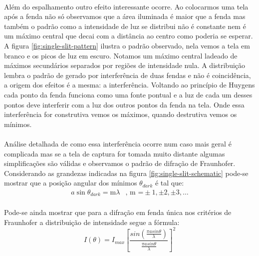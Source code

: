 \documentclass[a4paper,11pt]{article}
\begin{document}
\paragraph{}Além do espalhamento outro efeito interessante ocorre. 
Ao colocarmos uma tela após a fenda não só observamos que a área
iluminada é maior que a fenda mas também o padrão como a intensidade
de luz se distribui não é constante nem é um máximo central que decai 
com a distância ao centro como poderia se esperar.
 A figura \ref{fig:single-slit-pattern}
ilustra o padrão observado, nela vemos a tela em branco e os picos
de luz em escuro. Notamos um máximo central ladeado de máximos
secundários separados por regiões de intensidade nula. A distribuição 
lembra o padrão de gerado por interferência de duas fendas e não
é coincidência, a origem dos efeitos é a mesma: a interferência.
Voltando ao princípio de Huygens cada ponto da fenda funciona como
uma fonte pontual e a luz de cada um desses pontos deve interferir
com a luz dos outros pontos da fenda na tela. Onde essa interferência for
construtiva vemos os máximos, quando destrutiva vemos os 
mínimos.

\paragraph{} Análise detalhada de como essa interferência ocorre
num caso mais geral é complicada mas se a tela de captura for tomada
muito distante algumas simplificações são válidas e observamos o padrão
de difração de Fraunhofer. Considerando as grandezas indicadas na figura
\ref{fig:single-slit-schematic} pode-se mostrar que a posição
 angular dos mínimos $\theta _{dark}$ 
é tal que:
\begin{equation}
	\begin{array}{ll}
	a \sin \theta_{dark} = \mbox{m}\lambda & \mbox{, m =}
				 \pm 1, \pm 2, \pm 3, \ldots	
	\end{array}
	\label{eq:single-slit}
\end{equation}
 
\paragraph{}Pode-se ainda mostrar que para a difração em fenda única nos
 critérios de Fraunhofer a distribuição de intensidade segue a fórmula:
\begin{equation}
	I(\theta) =
	 I_{max} \left[
	 			\frac{
	 				sin\left(
	 					\frac{\pi a sin \theta}{\lambda}
	 					\right)
	 				}
					{
					\frac{\pi a sin \theta}{\lambda}
					}
				\right]^2
	\label{eq:single-slit-intensity-pattern}
\end{equation}
\end{document}
